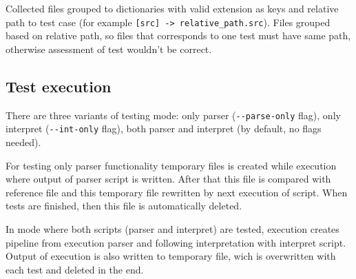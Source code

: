 \documentclass[10pt,a4paper]{article}
\begin{document}
Collected files grouped to dictionaries with valid extension as keys and relative
path to test case (for example \texttt{[src] -> relative\_path.src}). Files 
grouped based on relative path, so files that corresponds to one test must have 
same path, otherwise assessment of test wouldn't be correct. 

\subsection{Test execution}

There are three variants of testing mode: only parser (\texttt{-{}-parse-only} 
flag), only interpret (\texttt{-{}-int-only} flag), both parser and interpret 
(by default, no flags needed).   

For testing only parser functionality temporary files is created while execution 
where output of parser script is written. After that this file is compared with 
reference file and this temporary file rewritten by next execution of script. 
When tests are finished, then this file is automatically deleted.  

In mode where both scripts (parser and interpret) are tested, execution creates 
pipeline from execution parser and following interpretation with interpret script. 
Output of execution is also written to temporary file, wich is overwritten with 
each test and deleted in the end.
\end{document}
